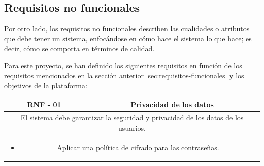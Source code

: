                 \newpage
        
        
        \subsection{Requisitos no funcionales}
            \label{sec:requisitos-nofuncionales}
            
            Por otro lado, los requisitos no funcionales describen las cualidades o atributos que debe tener un sistema, enfocándose en cómo hace el sistema lo que hace; es decir, cómo se comporta en términos de calidad.
            
            Para este proyecto, se han definido los siguientes requisitos en función de los requisitos mencionados en la sección anterior \ref{sec:requisitos-funcionales} y los objetivos de la plataforma:
            
            \begin{table}[!htbp]
                \centering
                \begin{tabular}{|c|c|}
                    \hline
                    \textbf{RNF - 01} & \textbf{Privacidad de los datos} \\
                    \hline
                    \multicolumn{2}{|p{15cm}|}{
                        El sistema debe garantizar la seguridad y privacidad de los datos de los usuarios.
                    } \\
                    \hline
                    \multicolumn{2}{|p{15cm}|}{
                        \begin{itemize}
                            \item Aplicar una política de cifrado para las contraseñas.
                        \end{itemize}
                        } \\
                    \hline
                \end{tabular}
                \label{tab:RNF1}
            \end{table}
            
